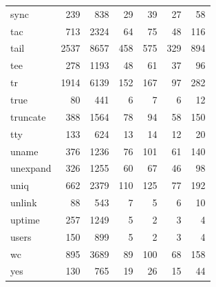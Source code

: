\begin{longtable}{lrrrrrr}
    sync            & 239        & 838      & 29              & 39              & 27             & 58       \\
    tac             & 713        & 2324     & 64              & 75              & 48             & 116      \\
    tail            & 2537       & 8657     & 458             & 575             & 329            & 894      \\
    tee             & 278        & 1193     & 48              & 61              & 37             & 96       \\
    tr              & 1914       & 6139     & 152             & 167             & 97             & 282      \\
    true            & 80         & 441      & 6               & 7               & 6              & 12       \\
    truncate        & 388        & 1564     & 78              & 94              & 58             & 150      \\
    tty             & 133        & 624      & 13              & 14              & 12             & 20       \\
    uname           & 376        & 1236     & 76              & 101             & 61             & 140      \\
    unexpand        & 326        & 1255     & 60              & 67              & 46             & 98       \\
    uniq            & 662        & 2379     & 110             & 125             & 77             & 192      \\
    unlink          & 88         & 543      & 7               & 5               & 6              & 10       \\
    uptime          & 257        & 1249     & 5               & 2               & 3              & 4        \\
    users           & 150        & 899      & 5               & 2               & 3              & 4        \\
    wc              & 895        & 3689     & 89              & 100             & 68             & 158      \\
    yes             & 130        & 765      & 19              & 26              & 15             & 44       \\
    \bottomrule
    \end{longtable}

